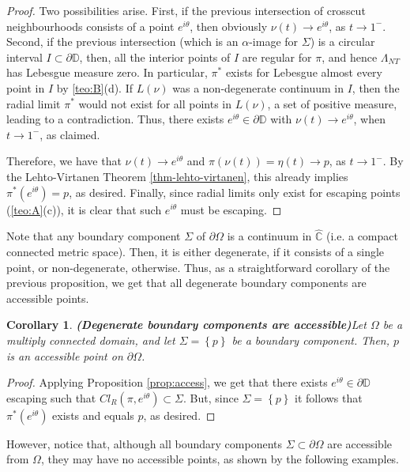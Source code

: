 \documentclass[11pt,a4paper,reqno]{amsart}
\theoremstyle{plain}
\newtheorem{cor}[thm]{Corollary}
\theoremstyle{definition}
\theoremstyle{plain}
\def\DD{\mathbb{D}}
\begin{document}
\begin{proof}
	Two possibilities arise. First, if the previous intersection of crosscut neighbourhoods consists of a point $ e^{i\theta} $, then obviously $ \nu (t)\to e^{i\theta} $,  as $ t\to 1^-$. Second, if the previous intersection (which is an $ \alpha $-image for $ \Sigma $) is a circular interval $ I\subset\partial\DD $, then, all the interior points of $ I $ are regular for $ \pi $, and hence $\Lambda_{NT}$ has Lebesgue measure zero. In particular, $ \pi^* $ exists for Lebesgue almost every point in $ I $ by \ref{teo:B}(d). If $ L(\nu) $ was a non-degenerate continuum in $ I $, then the radial limit $ \pi^* $ would not exist for all points in $ L(\nu) $, a set of positive measure, leading to a contradiction. Thus, there exists $ e^{i\theta} \in\partial\mathbb{D}$ with $ \nu (t)\to e^{i\theta} $,  when $ t\to 1 ^-$, as claimed.
	
	Therefore, we have that $ \nu (t)\to e^{i\theta} $ and $ \pi(\nu (t))=\eta(t)\to p $,  as $ t\to 1^- $. By the Lehto-Virtanen Theorem  \ref{thm-lehto-virtanen}, this already implies $ \pi^* (e^{i\theta}) =p$, as desired.
	Finally, since radial limits only exist for escaping points (\ref{teo:A}(c)), it is clear that such $ e^{i\theta} $ must be escaping.
	\end{proof}

Note that any boundary component $ \Sigma $ of $ \partial\Omega $ is a continuum in $ \widehat{\mathbb{C}} $ (i.e. a compact connected metric space). Then, it is either degenerate, if it consists of a single point, or non-degenerate, otherwise. Thus, as a straightforward corollary of the previous proposition, we get that all degenerate boundary components are accessible points.
\begin{cor}{\bf (Degenerate boundary components are accessible)}\label{cor:degenerate}
	Let $ \Omega $ be a multiply connected domain, and let $ \Sigma =\left\lbrace p\right\rbrace  $ be a boundary component. Then, $ p $ is an accessible  point on $ \partial \Omega$.
\end{cor}
\begin{proof}
	Applying Proposition \ref{prop:access}, we get that there exists $ e^{i\theta}\in \partial \mathbb{D} $ escaping such that $ Cl_R(\pi, e^{i\theta})\subset\Sigma $. But, since $ \Sigma =\left\lbrace p\right\rbrace  $ it follows that $ \pi^*(e^{i\theta})$ exists and equals $p $, as desired.
\end{proof}

However, notice that, although all boundary components $ \Sigma\subset \partial \Omega $ are accessible from $ \Omega $, they may  have no accessible points, as shown by the following examples.
\end{document}

